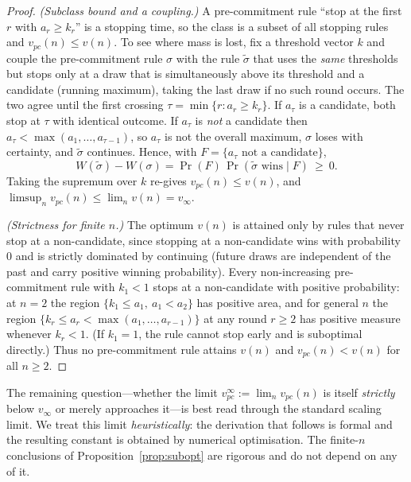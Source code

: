 \documentclass[11pt]{article}
\begin{document}
\begin{proof}
\textit{(Subclass bound and a coupling.)} A pre-commitment rule ``stop at the first $r$
with $a_r\ge k_r$'' is a stopping time, so the class is a subset of all stopping rules
and $v_{pc}(n)\le v(n)$. To see where mass is lost, fix a threshold vector $k$ and couple
the pre-commitment rule $\sigma$ with the rule $\tilde\sigma$ that uses the \emph{same}
thresholds but stops only at a draw that is simultaneously above its threshold and a
candidate (running maximum), taking the last draw if no such round occurs. The two agree
until the first crossing $\tau=\min\{r:a_r\ge k_r\}$. If $a_\tau$ is a candidate, both
stop at $\tau$ with identical outcome. If $a_\tau$ is \emph{not} a candidate then
$a_\tau<\max(a_1,\dots,a_{\tau-1})$, so $a_\tau$ is not the overall maximum, $\sigma$
loses with certainty, and $\tilde\sigma$ continues. Hence, with
$F=\{a_\tau\text{ not a candidate}\}$,
\begin{equation}\label{eq:coupling}
  W(\tilde\sigma)-W(\sigma)=\Pr(F)\,\Pr(\tilde\sigma\text{ wins}\mid F)\ \ge\ 0 .
\end{equation}
Taking the supremum over $k$ re-gives $v_{pc}(n)\le v(n)$, and $\limsup_n v_{pc}(n)\le
\lim_n v(n)=v_\infty$.

\textit{(Strictness for finite $n$.)} The optimum $v(n)$ is attained only by rules that
never stop at a non-candidate, since stopping at a non-candidate wins with probability
$0$ and is strictly dominated by continuing (future draws are independent of the past and
carry positive winning probability). Every non-increasing pre-commitment rule with
$k_1<1$ stops at a non-candidate with positive probability: at $n=2$ the region
$\{k_1\le a_1,\ a_1<a_2\}$ has positive area, and for general $n$ the region
$\{k_r\le a_r<\max(a_1,\dots,a_{r-1})\}$ at any round $r\ge 2$ has positive measure
whenever $k_r<1$. (If $k_1=1$, the rule cannot stop early and is suboptimal directly.)
Thus no pre-commitment rule attains $v(n)$ and $v_{pc}(n)<v(n)$ for all $n\ge 2$.
\end{proof}

The remaining question---whether the limit $v_{pc}^\infty:=\lim_n v_{pc}(n)$ is itself
\emph{strictly} below $v_\infty$ or merely approaches it---is best read through the
standard scaling limit. We treat this limit \emph{heuristically}: the derivation that
follows is formal and the resulting constant is obtained by numerical optimisation. The
finite-$n$ conclusions of Proposition~\ref{prop:subopt} are rigorous and do not depend on
any of it.
\end{document}
